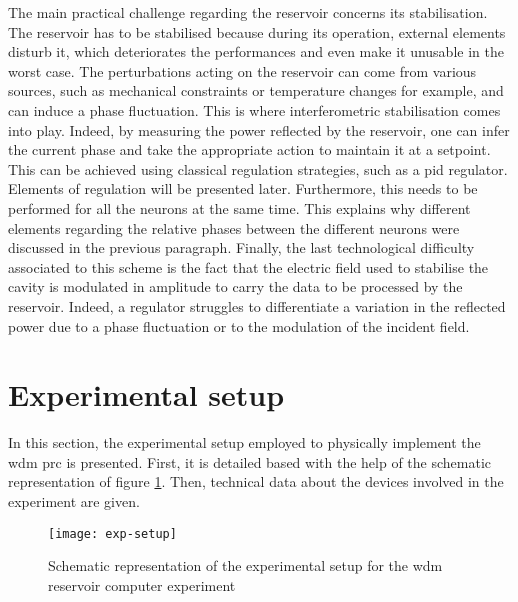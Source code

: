 The main practical challenge regarding the reservoir concerns its stabilisation. The reservoir has to be stabilised because during its operation, external elements disturb it, which deteriorates the performances and even make it unusable in the worst case. The perturbations acting on the reservoir can come from various sources, such as mechanical constraints or temperature changes for example, and can induce a phase fluctuation. This is where interferometric stabilisation comes into play. Indeed, by measuring the power reflected by the reservoir, one can infer the current phase and take the appropriate action to maintain it at a setpoint. This can be achieved using classical regulation strategies, such as a \gls{pid} regulator. Elements of regulation will be presented later. Furthermore, this needs to be performed for all the neurons at the same time. This explains why different elements regarding the relative phases between the different neurons were discussed in the previous paragraph. Finally, the last technological difficulty associated to this scheme is the fact that the electric field used to stabilise the cavity is modulated in amplitude to carry the data to be processed by the reservoir. Indeed, a regulator struggles to differentiate a variation in the reflected power due to a phase fluctuation or to the modulation of the incident field.


\section{Experimental setup}

In this section, the experimental setup employed to physically implement the \gls{wdm} \gls{prc} is presented. First, it is detailed based with the help of the schematic representation of figure \ref{exp-setup}. Then, technical data about the devices involved in the experiment are given.

\begin{figure}[h]
	\centering
	\texttt{[image: exp-setup]}
	\caption{Schematic representation of the experimental setup for the \gls{wdm} reservoir computer experiment}
	\label{exp-setup}
\end{figure}

